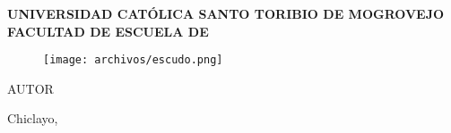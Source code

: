 \pagestyle{empty}
\begin{center}\bf
UNIVERSIDAD CATÓLICA SANTO TORIBIO DE MOGROVEJO\break
FACULTAD DE \MakeUppercase{\Facultad}\break
ESCUELA DE\MakeUppercase{\Escuela}

\begin{figure}[h]
    \centering\texttt{[image: archivos/escudo.png]}
\end{figure}

\MakeUppercase{\large\TituloProyecto}\break\break
AUTOR\break
{\Autor}\break

Chiclayo,\Fecha
\end{center}

\newpage

\begin{center}
\renewcommand\contentsname{\large Índice}
\tableofcontents

\newpage

\renewcommand\listtablename{\large Lista de tablas}
\listoftables

\newpage

\renewcommand\listfigurename{\large Lista de figuras}
\listoffigures

\newpage

\listofannexes
\end{center}
\newpage

\pagestyle{fancy}

